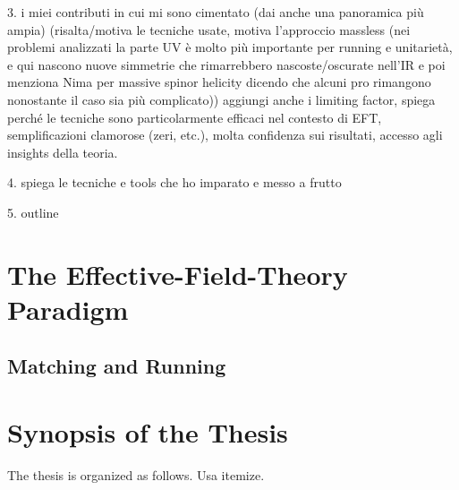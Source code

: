 3. i miei contributi in cui mi sono cimentato (dai anche una panoramica più ampia) (risalta/motiva le tecniche usate, motiva l'approccio massless (nei problemi analizzati la parte UV è molto più importante per running e unitarietà, e qui nascono nuove simmetrie che rimarrebbero nascoste/oscurate nell'IR e poi menziona Nima per massive spinor helicity dicendo che alcuni pro rimangono nonostante il caso sia più complicato)) aggiungi anche i limiting factor, spiega perché le tecniche sono particolarmente efficaci nel contesto di EFT, semplificazioni clamorose (zeri, etc.), molta confidenza sui risultati, accesso agli insights della teoria.

4. spiega le tecniche e tools che ho imparato e messo a frutto

5. outline

\section{The Effective-Field-Theory Paradigm}

\subsection{Matching and Running}

\section{Synopsis of the Thesis}

The thesis is organized as follows.
Usa itemize.